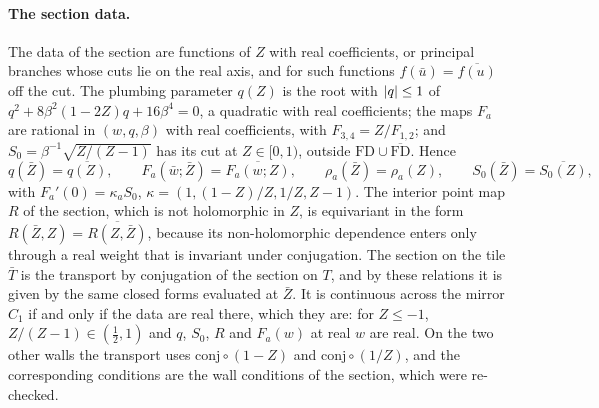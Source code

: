\paragraph{The section data.}
The data of the section are functions of $Z$ with real coefficients, or principal branches whose cuts lie on the real axis, and for such functions $f(\bar u) = \overline{f(u)}$ off the cut.
The plumbing parameter $q(Z)$ is the root with ${|q|} \le 1$ of $q^2 + 8 \beta^2 (1 - 2 Z) q + 16 \beta^4 = 0$, a quadratic with real coefficients; the maps $F_a$ are rational in $(w, q, \beta)$ with real coefficients, with $F_{3,4} = Z / F_{1,2}$; and $S_0 = \beta^{-1} \sqrt{Z / (Z - 1)}$ has its cut at $Z \in [0, 1)$, outside $\mathrm{FD} \cup \overline{\mathrm{FD}}$.
Hence
\begin{equation}
  q(\bar Z)
    = \overline{q(Z)},
  \qquad
  F_a(\bar w; \bar Z)
    = \overline{F_a(w; Z)},
  \qquad
  \rho_a(\bar Z)
    = \rho_a(Z),
  \qquad
  S_0(\bar Z)
    = \overline{S_0(Z)},
\end{equation}
with $F_a'(0) = \kappa_a S_0$, $\kappa = (1, (1 - Z) / Z, 1 / Z, Z - 1)$.
The interior point map $R$ of the section, which is not holomorphic in $Z$, is equivariant in the form $R(\bar Z, Z) = \overline{R(Z, \bar Z)}$, because its non-holomorphic dependence enters only through a real weight that is invariant under conjugation.
The section on the tile $\bar T$ is the transport by conjugation of the section on $T$, and by these relations it is given by the same closed forms evaluated at $\bar Z$.
It is continuous across the mirror $C_1$ if and only if the data are real there, which they are: for $Z \le - 1$, $Z / (Z - 1) \in (\frac{1}{2}, 1)$ and $q$, $S_0$, $R$ and $F_a(w)$ at real $w$ are real.
On the two other walls the transport uses $\mathrm{conj} \circ (1 - Z)$ and $\mathrm{conj} \circ (1 / Z)$, and the corresponding conditions are the wall conditions of the section, which were re-checked.

